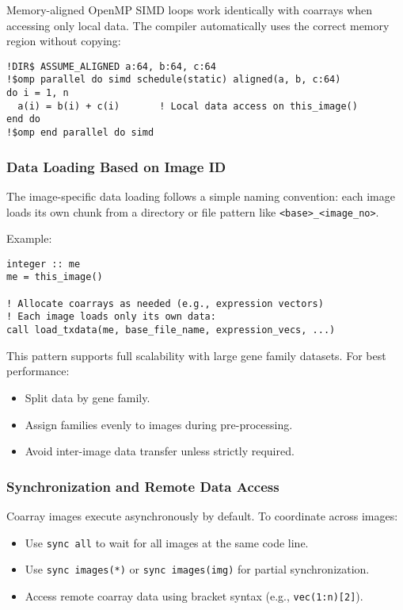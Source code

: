 \documentclass{article}
\begin{document}
Memory-aligned OpenMP SIMD loops work identically with coarrays when accessing only local data. The compiler automatically uses the correct memory region without copying:

\begin{verbatim}
!DIR$ ASSUME_ALIGNED a:64, b:64, c:64
!$omp parallel do simd schedule(static) aligned(a, b, c:64)
do i = 1, n
  a(i) = b(i) + c(i)       ! Local data access on this_image()
end do
!$omp end parallel do simd
\end{verbatim}

\subsubsection{Data Loading Based on Image ID}
The image-specific data loading follows a simple naming convention: each image loads its own chunk from a directory or file pattern like \texttt{<base>\_<image\_no>}.

Example:
\begin{verbatim}
integer :: me
me = this_image()

! Allocate coarrays as needed (e.g., expression vectors)
! Each image loads only its own data:
call load_txdata(me, base_file_name, expression_vecs, ...)
\end{verbatim}

This pattern supports full scalability with large gene family datasets. For best performance:
\begin{itemize}
\item Split data by gene family.
\item Assign families evenly to images during pre-processing.
\item Avoid inter-image data transfer unless strictly required.
\end{itemize}

\subsubsection{Synchronization and Remote Data Access}
Coarray images execute asynchronously by default. To coordinate across images:

\begin{itemize}
\item Use \texttt{sync all} to wait for all images at the same code line.
\item Use \texttt{sync images(*)} or \texttt{sync images(img)} for partial synchronization.
\item Access remote coarray data using bracket syntax (e.g., \texttt{vec(1:n)[2]}).
\end{itemize}
\end{document}
